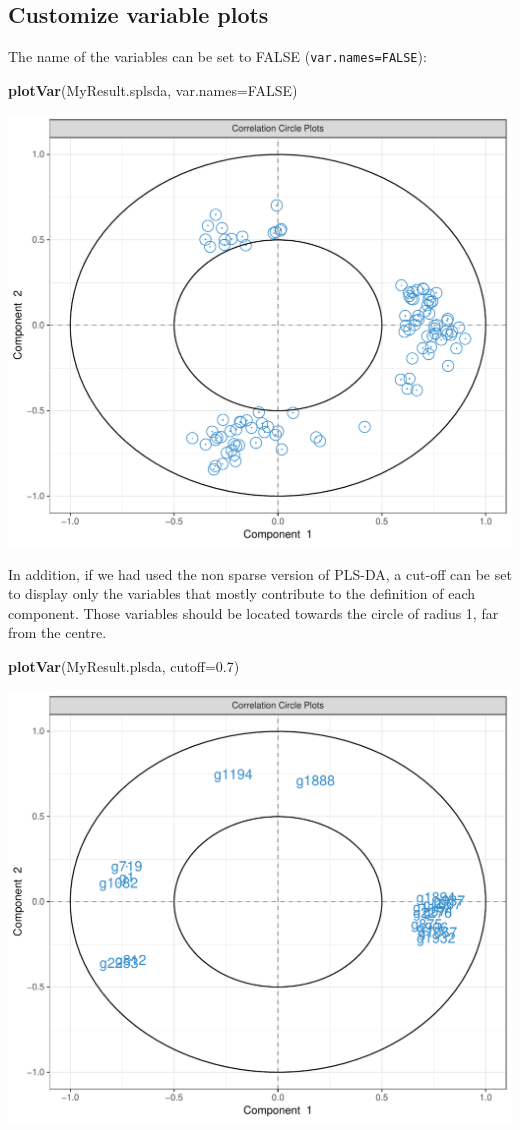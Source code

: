 \documentclass[]{book}
\newenvironment{Shaded}{\begin{snugshade}}{\end{snugshade}}
\newcommand{\DataTypeTok}[1]{\textcolor[rgb]{0.13,0.29,0.53}{#1}}
\newcommand{\FloatTok}[1]{\textcolor[rgb]{0.00,0.00,0.81}{#1}}
\newcommand{\KeywordTok}[1]{\textcolor[rgb]{0.13,0.29,0.53}{\textbf{#1}}}
\newcommand{\NormalTok}[1]{#1}
\newcommand{\OtherTok}[1]{\textcolor[rgb]{0.56,0.35,0.01}{#1}}
\begin{document}
\hypertarget{customize-variable-plots}{%
\subsection{Customize variable plots}\label{customize-variable-plots}}

The name of the variables can be set to FALSE (\texttt{var.names=FALSE}):

\begin{Shaded}
\begin{Highlighting}[]
\KeywordTok{plotVar}\NormalTok{(MyResult.splsda, }\DataTypeTok{var.names=}\OtherTok{FALSE}\NormalTok{)}
\end{Highlighting}
\end{Shaded}

\begin{center}\includegraphics[width=0.5\linewidth]{Figures/04-plsda-plotVar-1} \end{center}

In addition, if we had used the non sparse version of PLS-DA, a cut-off can be set to display only the variables that mostly contribute to the definition of each component. Those variables should be located towards the circle of radius 1, far from the centre.

\begin{Shaded}
\begin{Highlighting}[]
\KeywordTok{plotVar}\NormalTok{(MyResult.plsda, }\DataTypeTok{cutoff=}\FloatTok{0.7}\NormalTok{)}
\end{Highlighting}
\end{Shaded}

\begin{center}\includegraphics[width=0.5\linewidth]{Figures/04-plsda-plotVar-cutoff-1} \end{center}
\end{document}
